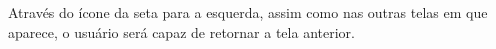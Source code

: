 Através do ícone da seta para a esquerda, assim como nas outras telas em que aparece, o usuário será capaz de retornar a tela anterior. 

